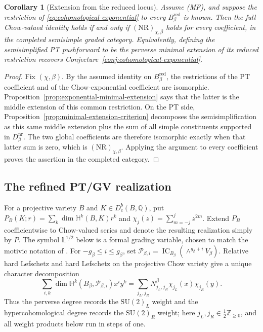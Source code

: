 \documentclass[11pt,reqno]{amsart}
\newtheorem{corollary}[theorem]{Corollary}
\theoremstyle{definition}
\newcommand{\Q}{\mathbb Q}
\newcommand{\IC}{\operatorname{IC}}
\newcommand{\red}{\mathrm{red}}
\newcommand{\nr}{\mathrm{nr}}
\begin{document}
\begin{corollary}[Extension from the reduced locus]
\label{cor:reduced-exponential}
Assume \emph{(MF)}, and suppose the restriction of
\eqref{eq:cohomological-exponential} to every
$B_\beta^{\red}$ is known.  Then the full Chow-valued identity holds if and
only if $(\mathrm{NR})_{\chi,\beta}$ holds for every coefficient, in the
completed semisimple graded category.  Equivalently, defining the
semisimplified PT pushforward to be the perverse minimal extension of its
reduced restriction recovers Conjecture~\ref{conj:cohomological-exponential}.
\end{corollary}

\begin{proof}
Fix $(\chi,\beta)$.  By the assumed identity on $B_\beta^{\red}$, the
restrictions of the PT coefficient and of the Chow-exponential coefficient
are isomorphic.  Proposition~\ref{prop:exponential-minimal-extension} says
that the latter is the middle extension of this common restriction.  On the
PT side, Proposition~\ref{prop:minimal-extension-criterion} decomposes the
semisimplification as this same middle extension plus the sum of all simple
constituents supported in $D_\beta^{\nr}$.  The two global coefficients are
therefore isomorphic exactly when that latter sum is zero, which is
$(\mathrm{NR})_{\chi,\beta}$.  Applying the argument to every coefficient
proves the assertion in the completed category.
\end{proof}

\subsection{The refined PT/GV realization}

For a projective variety $B$ and $K\in D_c^b(B,\Q)$, put
$P_B(K;r)=\sum_k\dim\mathbb H^k(B,K)r^k$ and
$\chi_j(z)=\sum_{m=-j}^{j}z^{2m}$.  Extend $P_B$ coefficientwise to
Chow-valued series and denote the resulting realization simply by $P$.
The symbol $\mathbb L^{1/2}$ below is a formal grading variable, chosen to
match the motivic notation of \cite{CKK}.  For
$-g_\beta\le i\le g_\beta$, set
$\mathcal P_{\beta,i}=\IC_{B_\beta}(\wedge^{g_\beta+i}V_\beta)$.
Relative hard Lefschetz and hard Lefschetz on the projective Chow variety
give a unique character decomposition
\begin{equation}\label{eq:refined-gv-character}
 \sum_{i,k}\dim\mathbb H^k(B_\beta,\mathcal P_{\beta,i})x^iy^k
 =\sum_{j_L,j_R}N^\beta_{j_L,j_R}
   \chi_{j_L}(x)\chi_{j_R}(y).
\end{equation}
Thus the perverse degree records the $\mathrm{SU}(2)_L$ weight and the
hypercohomological degree records the $\mathrm{SU}(2)_R$ weight; here
$j_L,j_R\in\frac12\mathbb Z_{\ge0}$, and all weight products below run in
steps of one.
\end{document}
